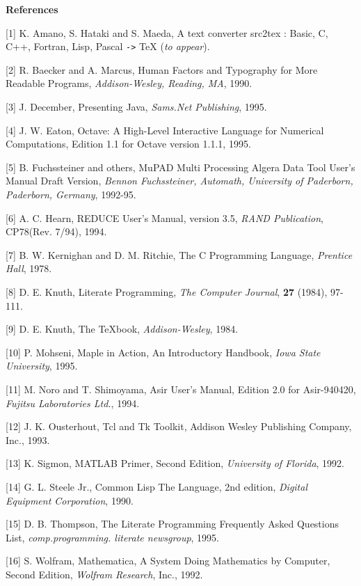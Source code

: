 \centerline{\bf References}

\bigskip

{\frenchspacing

\item{[1]}
K. Amano, S. Hataki and S. Maeda,
A text converter src2tex : Basic, C, C++, Fortran, Lisp, Pascal {\tt ->} \TeX
\quad ({\sl to appear\/}).

\item{[2]}
R. Baecker and A. Marcus,
Human Factors and Typography for More Readable Programs,
{\sl Addison-Wesley, Reading, MA}, 1990.

\item{[3]}
J. December,
Presenting Java,
{\sl Sams.Net Publishing}, 1995.

\item{[4]}
J. W. Eaton,
Octave: A High-Level Interactive Language for Numerical Computations,
Edition 1.1 for Octave version 1.1.1, 1995.

\item{[5]}
B. Fuchssteiner and others,
MuPAD Multi Processing Algera Data Tool User's Manual Draft Version,
{\sl Bennon Fuchssteiner, Automath,
University of Paderborn, Paderborn, Germany}, 1992-95.

\item{[6]}
A. C. Hearn,
REDUCE User's Manual, version 3.5,
{\sl RAND Publication}, CP78(Rev. 7/94), 1994.

\item{[7]}
B. W. Kernighan and D. M. Ritchie,
The C Programming Language,
{\sl Prentice Hall}, 1978.

\item{[8]}
D. E. Knuth,
Literate Programming,
{\sl The Computer Journal},
{\bf 27} (1984), 97-111.

\item{[9]}
D. E. Knuth,
The {\TeX}book,
{\sl Addison-Wesley}, 1984.

\item{[10]}
P. Mohseni,
Maple in Action,
An Introductory Handbook,
{\sl Iowa State University}, 1995.

\item{[11]}
M. Noro and T. Shimoyama,
Asir User's Manual, Edition 2.0 for Asir-940420,
{\sl Fujitsu Laboratories Ltd.}, 1994.

\item{[12]}
J. K. Ousterhout,
Tcl and Tk Toolkit,
Addison Wesley Publishing Company, Inc., 1993.

\item{[13]}
K. Sigmon,
MATLAB Primer, Second Edition,
{\sl University of Florida}, 1992.

\item{[14]}
G. L. Steele Jr.,
Common Lisp The Language, 2nd edition,
{\sl Digital Equipment Corporation}, 1990.

\item{[15]}
D. B. Thompson,
The Literate Programming Frequently Asked Questions List,
{\sl comp.programming. literate newsgroup}, 1995.

\item{[16]}
S. Wolfram,
Mathematica,
A System Doing Mathematics by Computer, Second Edition,
{\sl Wolfram Research}, Inc., \rm 1992.

}
